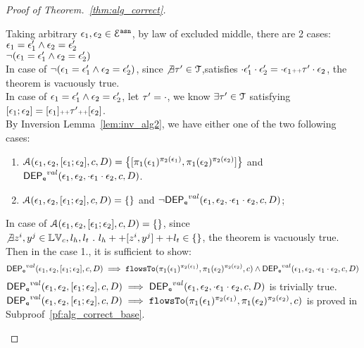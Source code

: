\begin{proof}[Proof of Theorem.~\ref{thm:alg_correct}]
\begin{case}
\[\]
%
Taking arbitrary $ \mathtt{\epsilon}_1, \mathtt{\epsilon}_2 \in \mathcal{E}^{\mathtt{{asn}}}$, by law of excluded middle, there are 2 cases:
\\
$\mathtt{\epsilon}_1 = \mathtt{\epsilon}_1' \land  \mathtt{\epsilon}_2 = \mathtt{\epsilon}_2'$
\\
$\neg(\mathtt{\epsilon}_1 = \mathtt{\epsilon}_1' \land  \mathtt{\epsilon}_2 = \mathtt{\epsilon}_2')$
\\
In case of $\neg(\mathtt{\epsilon}_1 = \mathtt{\epsilon}_1' \land  \mathtt{\epsilon}_2 = \mathtt{\epsilon}_2')$, since 
$\not\exists \mathtt{\tau}' \in \mathcal{T}$,satisfies $
\cdot {} \mathtt{\epsilon}_1' \cdot {} \mathtt{\epsilon}_2'  = \cdot {} \mathtt{\epsilon}_1 {\scriptscriptstyle ++} \mathtt{\tau}' \cdot \mathtt{\epsilon}_2$, 
the theorem is vacuously true.
\\
%
In case of $\mathtt{\epsilon}_1 = \mathtt{\epsilon}_1' \land  \mathtt{\epsilon}_2 = \mathtt{\epsilon}_2'$,
let $\mathtt{\tau}' = \cdot$, we know $\exists \mathtt{\tau}' \in \mathcal{T}$ satisfying 
$[\mathtt{\epsilon}_1; \mathtt{\epsilon}_2] = [\mathtt{\epsilon}_1] {\scriptscriptstyle ++} \mathtt{\tau}' {\scriptscriptstyle ++} [\mathtt{\epsilon}_2]$.
\\
By Inversion Lemma~\ref{lem:inv_alg2}, we have either one of the two following cases:
\begin{enumerate}
  \item $\mathcal{A}(\event_1, \event_2, [\event_1; \event_2], c, D) = 
  \left\{[\pi_1(\event_1)^{\pi_2(\event_1)}, \pi_1(\event_2)^{\pi_2(\event_2)}] \right \}$ 
  and $\mathsf{DEP_{\mathtt{e}}}^{val}(\mathtt{\epsilon}_1, \mathtt{\epsilon}_2, \cdot  \mathtt{\epsilon}_1 \cdot \mathtt{\epsilon}_2, c, D)$.
  \item  $\mathcal{A}(\mathtt{\epsilon}_1, \mathtt{\epsilon}_2, [\mathtt{\epsilon}_1; \mathtt{\epsilon}_2], c, D) = \{\}$ 
  and $\neg \mathsf{DEP_{\mathtt{e}}}^{val}(\mathtt{\epsilon}_1, \mathtt{\epsilon}_2, \cdot  \mathtt{\epsilon}_1 \cdot \mathtt{\epsilon}_2, c, D)$;
\end{enumerate}
%
In case of $\mathcal{A}(\mathtt{\epsilon}_1, \mathtt{\epsilon}_2, [\mathtt{\epsilon}_1; \mathtt{\epsilon}_2], c, D) = \{\}$,
since $\not\exists  z^i, y^j \in \mathbb{LV}_c, l_h, l_t ~.~ l_h ++ [z^i, y^j] ++ l_t \in \{\}$, the theorem is vacuously true.
%
\\
Then in the case 1., it is sufficient to show: 
\[
  \mathsf{DEP_{\mathtt{e}}}^{val}(\mathtt{\epsilon}_1, \mathtt{\epsilon}_2, [\mathtt{\epsilon}_1; \mathtt{\epsilon}_2], c, D) 
  \implies \mathtt{flowsTo}(\pi_1(\mathtt{\epsilon}_1)^{\pi_2(\mathtt{\epsilon}_1)}, \pi_1(\mathtt{\epsilon}_2)^{\pi_2(\mathtt{\epsilon}_2)}, c)
  \land \mathsf{DEP_{\mathtt{e}}}^{val}(\mathtt{\epsilon}_1, \mathtt{\epsilon}_2, \cdot  \mathtt{\epsilon}_1 \cdot \mathtt{\epsilon}_2, c, D)
\]
%
$\mathsf{DEP_{\mathtt{e}}}^{val}(\mathtt{\epsilon}_1, \mathtt{\epsilon}_2, [\mathtt{\epsilon}_1; \mathtt{\epsilon}_2], c, D) 
\implies \mathsf{DEP_{\mathtt{e}}}^{val}(\mathtt{\epsilon}_1, \mathtt{\epsilon}_2, \cdot  \mathtt{\epsilon}_1 \cdot \mathtt{\epsilon}_2, c, D)$ is trivially true.
\\
$ \mathsf{DEP_{\mathtt{e}}}^{val}(\mathtt{\epsilon}_1, \mathtt{\epsilon}_2, [\mathtt{\epsilon}_1; \mathtt{\epsilon}_2], c, D) 
\implies \mathtt{flowsTo}(\pi_1(\mathtt{\epsilon}_1)^{\pi_2(\mathtt{\epsilon}_1)}, \pi_1(\mathtt{\epsilon}_2)^{\pi_2(\mathtt{\epsilon}_2)}, c)$ is
proved in Subproof~\ref{pf:alg_correct_base}.

\end{case}
\end{proof}

